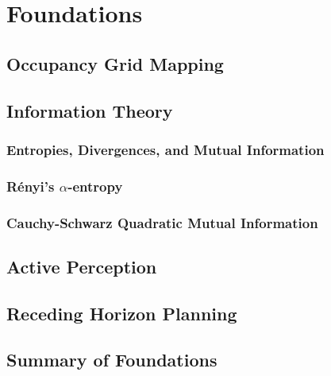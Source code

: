 \chapter{Foundations}

\section{Occupancy Grid Mapping}

\section{Information Theory}

\subsection{Entropies, Divergences, and Mutual Information}

\subsection{R\'{e}nyi's $\alpha$-entropy}

\subsection{Cauchy-Schwarz Quadratic Mutual Information}

\section{Active Perception}

\section{Receding Horizon Planning}

\section{Summary of Foundations}
